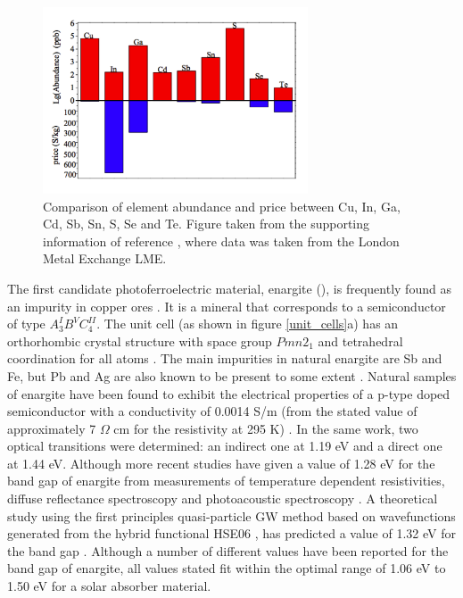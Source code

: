 \begin{figure}[h!]
  \centering
    \includegraphics[width=0.7\textwidth]{figures/abundance.png}
    \caption{Comparison of element abundance and price between Cu, In, Ga, Cd, Sb, Sn, S, Se and Te. Figure taken from the supporting information of reference , where data was taken from the London Metal Exchange LME.}
  \label{abundance}
\end{figure}

The first candidate photoferroelectric material, enargite (\enargite), is frequently found as an impurity in copper ores \cite{enargite_EIS}. It is a mineral that corresponds to a semiconductor of type $A^I_3B^VC^{II}_4$. The unit cell (as shown in figure \ref{unit_cells}a) has an orthorhombic crystal structure with space group $Pmn2_1$ and tetrahedral coordination for all atoms \cite{ores}.
The main impurities in natural enargite are Sb and Fe, but Pb and Ag are also known to be present to some extent \cite{enargite_EIS}.
Natural samples of enargite have been found to exhibit the electrical properties of a p-type doped semiconductor with a conductivity of  0.0014 S/m (from the stated value of approximately 7 $\Omega$ cm for the resistivity at 295 K) \cite{enargite_properties}. In the same work, two optical transitions were determined: an indirect one at 1.19 eV and a direct one at 1.44 eV. Although more recent studies have given a value of 1.28 eV for the band gap of enargite from measurements of temperature dependent resistivities, diffuse reflectance spectroscopy and photoacoustic spectroscopy  \cite{Dittrich1}. A theoretical study using the first principles quasi-particle GW method based on wavefunctions generated from the hybrid functional HSE06 \cite{HSE}, has predicted a value of 1.32 eV for the band gap \cite{Zunger}. Although a number of different values have been reported for the band gap of enargite, all values stated fit within the optimal range of 1.06 eV to 1.50 eV \cite{CZTS_book} for a solar absorber material.

